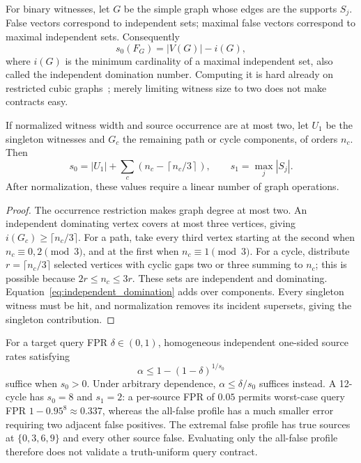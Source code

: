 \documentclass[../main.tex]{subfiles}
\begin{document}
For binary witnesses, let $G$ be the simple graph whose edges are the
supports $S_j$. False vectors correspond to independent sets; maximal
false vectors correspond to maximal independent sets. Consequently
\begin{equation}
 s_0(F_G)=|V(G)|-i(G),
 \label{eq:independent_domination}
\end{equation}
where $i(G)$ is the minimum cardinality of a maximal independent set, also
called the independent domination number. Computing it is hard already
on restricted cubic graphs~\cite{liu2015independent}; merely limiting
witness size to two does not make contracts easy.

\begin{theorem}
\label{thm:degree_two_contract}
If normalized witness width and source occurrence are at most two, let $U_1$
be the singleton witnesses and $G_c$ the remaining path or cycle components,
of orders $n_c$. Then
\[
 s_0=|U_1|+\sum_c\left(n_c-\left\lceil n_c/3\right\rceil\right),
 \qquad s_1=\max_j|S_j|.
\]
After normalization, these values require a linear number of graph operations.
\end{theorem}
\begin{proof}
The occurrence restriction makes graph degree at most two. An independent
dominating vertex covers at most three vertices, giving
$i(G_c)\geq\lceil n_c/3\rceil$. For a path, take every third vertex starting
at the second when $n_c\equiv0,2\pmod3$, and at the first when
$n_c\equiv1\pmod3$. For a cycle, distribute $r=\lceil n_c/3\rceil$ selected
vertices with cyclic gaps two or three summing to $n_c$; this is possible
because $2r\leq n_c\leq3r$. These sets are independent and dominating.
Equation~\eqref{eq:independent_domination} adds over components. Every
singleton witness must be hit, and normalization removes its incident
supersets, giving the singleton contribution.
\end{proof}

For a target query FPR $\delta\in(0,1)$, homogeneous independent one-sided
source rates satisfying
\begin{equation}
 \alpha\leq1-(1-\delta)^{1/s_0}
 \label{eq:calibrated_alpha}
\end{equation}
suffice when $s_0>0$. Under arbitrary dependence, $\alpha\leq\delta/s_0$
suffices instead. A 12-cycle has $s_0=8$ and $s_1=2$: a per-source FPR
of $0.05$ permits worst-case query FPR $1-0.95^8\approx0.337$, whereas
the all-false profile has a much smaller error requiring two adjacent
false positives. The extremal false profile has true sources at
$\{0,3,6,9\}$ and every other source false. Evaluating only the all-false
profile therefore does not validate a truth-uniform query contract.
\end{document}
